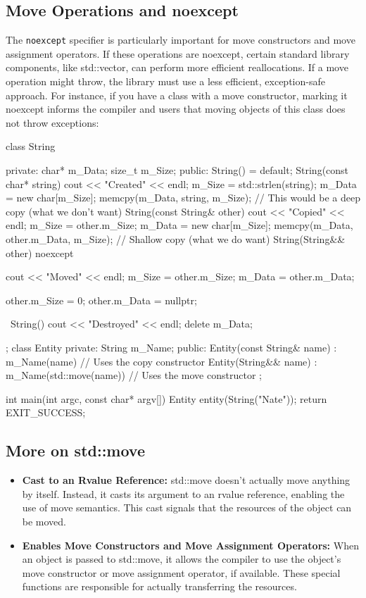 \documentclass{report}
\begin{document}
    \subsection{Move Operations and noexcept}
    \bigbreak \noindent 
    \begin{concept}
        The \texttt{noexcept} specifier is particularly important for move constructors and move assignment operators. If these operations are noexcept, certain standard library components, like std::vector, can perform more efficient reallocations. If a move operation might throw, the library must use a less efficient, exception-safe approach.
        \bigbreak \noindent 
        For instance, if you have a class with a move constructor, marking it noexcept informs the compiler and users that moving objects of this class does not throw exceptions:
    \end{concept}
    \bigbreak \noindent 
    \begin{cppcode}
class String {
private:
    char* m_Data;
    size_t m_Size;
public:
    String() = default;
    String(const char* string)  {
        cout << "Created" << endl;
        m_Size = std::strlen(string);
        m_Data = new char[m_Size];
        memcpy(m_Data, string, m_Size);
    }
    // This would be a deep copy (what we don't want)
    String(const String& other) {
        cout << "Copied" << endl;
        m_Size = other.m_Size;
        m_Data = new char[m_Size];
        memcpy(m_Data, other.m_Data, m_Size);
    }
    // Shallow copy (what we do want)
    String(String&& other) noexcept {
        cout << "Moved" << endl;
        m_Size = other.m_Size;
        m_Data = other.m_Data;

        other.m_Size = 0;
        other.m_Data = nullptr;
    }
    ~String() {
        cout << "Destroyed" << endl;
        delete m_Data;
    }
};
class Entity {
private:
    String m_Name;
public:
    Entity(const String& name) : m_Name(name) {} // Uses the copy constructor 
    Entity(String&& name) : m_Name(std::move(name)) {} // Uses the move constructor
};

int main(int argc, const char* argv[]) { Entity entity(String("Nate")); return EXIT_SUCCESS; }
    \end{cppcode}

    \pagebreak 
    \subsection{More on std::move}
    \bigbreak \noindent 
    \begin{itemize}
        \item \textbf{Cast to an Rvalue Reference:} std::move doesn't actually move anything by itself. Instead, it casts its argument to an rvalue reference, enabling the use of move semantics. This cast signals that the resources of the object can be moved.
        \item \textbf{Enables Move Constructors and Move Assignment Operators:} When an object is passed to std::move, it allows the compiler to use the object's move constructor or move assignment operator, if available. These special functions are responsible for actually transferring the resources.
    \end{itemize}
    \bigbreak \noindent 
\end{document}
